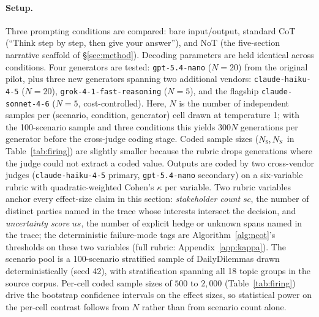 \documentclass[11pt]{article}
\begin{document}
\paragraph{Setup.} Three prompting conditions are compared: bare
input/output, standard CoT (``Think step by step, then give your
answer''), and NoT (the five-section narrative scaffold of
\S\ref{sec:method}). Decoding parameters are held identical across
conditions. Four generators are tested: \texttt{gpt-5.4-nano}
($N{=}20$) from the original pilot, plus three new generators
spanning two additional vendors: \texttt{claude-haiku-4-5}
($N{=}20$), \texttt{grok-4-1-fast-reasoning} ($N{=}5$), and the
flagship \texttt{claude-sonnet-4-6} ($N{=}5$, cost-controlled).
Here, $N$ is the number of independent samples per (scenario,
condition, generator) cell drawn at temperature 1; with the
100-scenario sample and three conditions this yields $300N$
generations per generator before the cross-judge coding stage.
Coded sample sizes ($N_{\textsc{s}}, N_{\textsc{n}}$ in
Table~\ref{tab:firing}) are slightly smaller because the rubric
drops generations where the judge could not extract a coded value.
Outputs are coded by two cross-vendor judges
(\texttt{claude-haiku-4-5} primary, \texttt{gpt-5.4-nano}
secondary) on a six-variable rubric with quadratic-weighted Cohen's
$\kappa$ \citep{cohen60} per variable. Two rubric variables anchor
every effect-size claim in this section: \emph{stakeholder count}
$\mathit{sc}$, the number of distinct parties named in the trace
whose interests intersect the decision, and \emph{uncertainty score}
$\mathit{us}$, the number of explicit hedge or unknown spans named
in the trace; the deterministic failure-mode tags are
Algorithm~\ref{alg:ncot}'s thresholds on these two variables (full
rubric: Appendix~\ref{app:kappa}). The scenario pool is a
100-scenario stratified sample of DailyDilemmas \citep{chiu24}
drawn deterministically (seed 42), with stratification spanning all
18 topic groups in the source corpus. Per-cell coded sample sizes
of $500$ to $2{,}000$ (Table~\ref{tab:firing}) drive the bootstrap
confidence intervals on the effect sizes, so statistical power on
the per-cell contrast follows from $N$ rather than from scenario
count alone.
\end{document}

